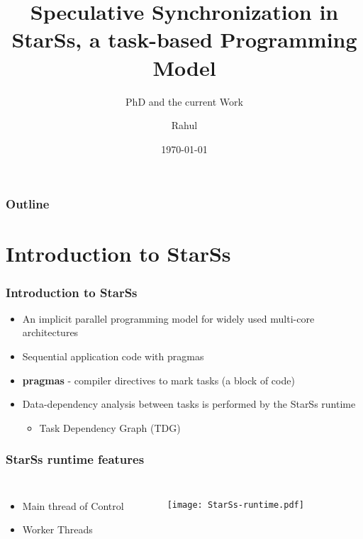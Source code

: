 \documentclass{beamer}
\title{Speculative Synchronization in StarSs, a task-based Programming Model}
\subtitle{PhD and the current Work}
\author{Rahul}
\date{\today}
\begin{document}
\begin{frame}
 \titlepage
\end{frame}

\begin{frame}
 \frametitle{Outline}
 \tableofcontents
\end{frame}


\section{Introduction to StarSs}

\begin{frame}

\frametitle{Introduction to StarSs}

  \begin{itemize}
   \item An implicit parallel programming model for widely used multi-core architectures
   \item Sequential application code with pragmas
   \item \textbf{pragmas} - compiler directives to mark tasks (a block of code)
   \item Data-dependency analysis between tasks is performed by the StarSs runtime
   \begin{itemize}
    \item Task Dependency Graph (TDG)
   \end{itemize}
  \end{itemize}
  
\end{frame}

 \begin{frame}
 
\frametitle{StarSs runtime features}

\begin{columns}
 
 \begin{itemize}
  \item Main thread of Control
  \item Worker Threads
  \end{itemize}
  
  \begin{figure}
  \centering
   \texttt{[image: StarSs-runtime.pdf]}
  \end{figure}


\end{columns}
  
\end{frame}
\end{document}
